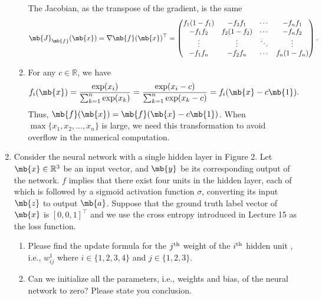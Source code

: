 \begin{exercise}
\begin{enumerate}
\begin{solution}
\begin{enumerate}
                        The Jacobian, as the transpose of the gradient, is the same
                        \begin{align*}
                            \mb{J}_\mb{f}(\mb{x}) & = \nabla \mb{f}(\mb{x})^{\top} =
                            \begin{pmatrix}
                                f_1(1-f_1) & -f_2f_1    & \cdots & -f_nf_1    \\
                                -f_1f_2    & f_2(1-f_2) & \cdots & -f_nf_2    \\
                                \vdots     & \vdots     & \ddots & \vdots     \\
                                -f_1f_n    & -f_2f_n    & \cdots & f_n(1-f_n)
                            \end{pmatrix}.
                        \end{align*}
                    \item For any $c \in \mathbb{R}$, we have
                        \begin{align*}
                            f_i(\mb{x}) = \frac{\exp(x_i)}{\sum_{k=1}^{n}\exp(x_k)} = \frac{\exp(x_i-c)}{\sum_{k=1}^{n}\exp(x_k-c)} = f_i(\mb{x}-c\mb{1}).
                        \end{align*}
                        Thus, $\mb{f}(\mb{x})=\mb{f}(\mb{x}-c\mb{1})$. When $\max\{x_1,x_2,...,x_n\}$ is large, we need this transformation to avoid overflow in the numerical computation.
                        \qedhere
                \end{enumerate}
            \end{solution}
        \item Consider the neural network with a single hidden layer in Figure 2. Let $\mb{x}\in\mathbb{R}^3$ be an input vector, and $\mb{y}$ be its corresponding output of the network. $f$ implies that there exist four units in the hidden layer, each of which is followed by a sigmoid activation function $\sigma$, converting its input $\mb{z}$ to output $\mb{a}$. Suppose that  the ground truth label vector of $\mb{x}$ is $[0,0,1]^\top$ and we use the cross entropy introduced in Lecture 15 as the loss function.
            \begin{enumerate}
                \item Please find the update formula for the $j^{\rm th}$ weight of the $i^{\rm th}$ hidden unit , i.e., $w^1_{ij}$ where $i\in\{1,2,3,4\}$ and $j\in\{1,2,3\}$.
                \item Can we initialize all the parameters, i.e., weights and bias, of the neural network to zero? Please state you conclusion.
            \end{enumerate}


\end{enumerate}
\end{exercise}
